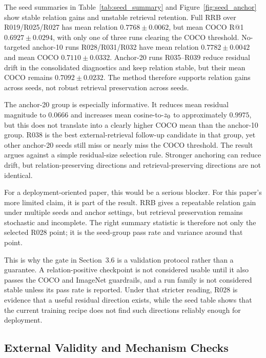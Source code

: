 The seed summaries in Table~\ref{tab:seed_summary} and Figure~\ref{fig:seed_anchor} show stable relation gains and unstable retrieval retention. Full RRB over R019/R025/R027 has mean relation $0.7768 \pm 0.0062$, but mean COCO R@1 $0.6927 \pm 0.0294$, with only one of three runs clearing the COCO threshold. No-targeted anchor-10 runs R028/R031/R032 have mean relation $0.7782 \pm 0.0042$ and mean COCO $0.7110 \pm 0.0332$. Anchor-20 runs R035--R039 reduce residual drift in the consolidated diagnostics and keep relation stable, but their mean COCO remains $0.7092 \pm 0.0232$. The method therefore supports relation gains across seeds, not robust retrieval preservation across seeds.

The anchor-20 group is especially informative. It reduces mean residual magnitude to $0.0666$ and increases mean cosine-to-$z_0$ to approximately $0.9975$, but this does not translate into a clearly higher COCO mean than the anchor-10 group. R038 is the best external-retrieval follow-up candidate in that group, yet other anchor-20 seeds still miss or nearly miss the COCO threshold. The result argues against a simple residual-size selection rule. Stronger anchoring can reduce drift, but relation-preserving directions and retrieval-preserving directions are not identical.

For a deployment-oriented paper, this would be a serious blocker. For this paper's more limited claim, it is part of the result. RRB gives a repeatable relation gain under multiple seeds and anchor settings, but retrieval preservation remains stochastic and incomplete. The right summary statistic is therefore not only the selected R028 point; it is the seed-group pass rate and variance around that point.

This is why the gate in Section~3.6 is a validation protocol rather than a guarantee. A relation-positive checkpoint is not considered usable until it also passes the COCO and ImageNet guardrails, and a run family is not considered stable unless its pass rate is reported. Under that stricter reading, R028 is evidence that a useful residual direction exists, while the seed table shows that the current training recipe does not find such directions reliably enough for deployment.



\subsection{External Validity and Mechanism Checks}

